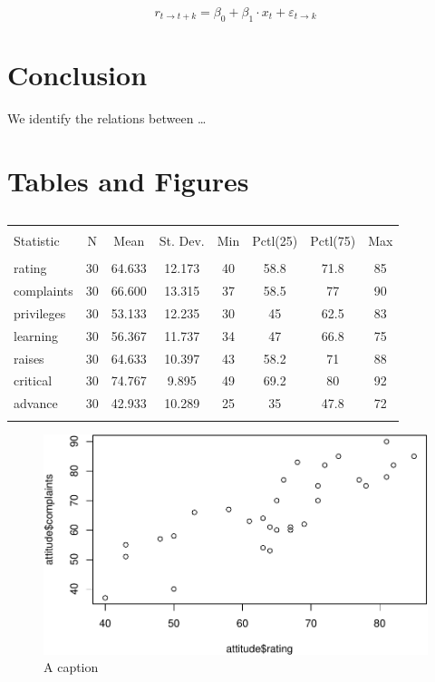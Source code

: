 \documentclass[
  12pt,
]{article}
\begin{document}
\[ r_{t \rightarrow t+k}= \beta_0 + \beta_1 \cdot x_t +\varepsilon_{t \rightarrow k} \]

\hypertarget{conclusion}{%
\section{Conclusion}\label{conclusion}}

We identify the relations between \ldots{}

\newpage

\hypertarget{tables-and-figures}{%
\section{Tables and Figures}\label{tables-and-figures}}

\begin{table}[!htbp] \centering 
  \caption{} 
  \label{} 
\begin{tabular}{@{\extracolsep{5pt}}lccccccc} 
\\[-1.8ex]\hline 
\hline \\[-1.8ex] 
Statistic & \multicolumn{1}{c}{N} & \multicolumn{1}{c}{Mean} & \multicolumn{1}{c}{St. Dev.} & \multicolumn{1}{c}{Min} & \multicolumn{1}{c}{Pctl(25)} & \multicolumn{1}{c}{Pctl(75)} & \multicolumn{1}{c}{Max} \\ 
\hline \\[-1.8ex] 
rating & 30 & 64.633 & 12.173 & 40 & 58.8 & 71.8 & 85 \\ 
complaints & 30 & 66.600 & 13.315 & 37 & 58.5 & 77 & 90 \\ 
privileges & 30 & 53.133 & 12.235 & 30 & 45 & 62.5 & 83 \\ 
learning & 30 & 56.367 & 11.737 & 34 & 47 & 66.8 & 75 \\ 
raises & 30 & 64.633 & 10.397 & 43 & 58.2 & 71 & 88 \\ 
critical & 30 & 74.767 & 9.895 & 49 & 69.2 & 80 & 92 \\ 
advance & 30 & 42.933 & 10.289 & 25 & 35 & 47.8 & 72 \\ 
\hline \\[-1.8ex] 
\end{tabular} 
\end{table}

\newpage

\begin{figure}
\centering
\includegraphics{main_files/figure-latex/unnamed-chunk-2-1.pdf}
\caption{A caption}
\end{figure}
\end{document}

